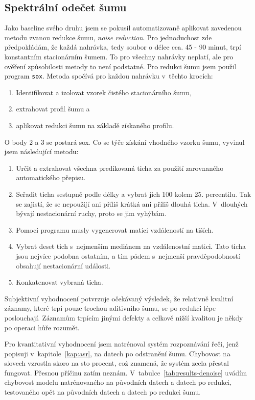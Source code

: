 \subsection{Spektrální odečet šumu}

Jako baseline svého druhu jsem se pokusil automatizovaně aplikovat zavedenou
metodu zvanou redukce šumu, \textit{noise reduction}. Pro jednoduchost zde
předpokládám, že každá nahrávka, tedy soubor o délce cca. 45 - 90 minut, trpí konstantním stacionárním šumem. To pro
všechny nahrávky neplatí, ale pro ověření způsobilosti metody to není podstatné.
Pro redukci šumu jsem použil program \texttt{sox}. Metoda spočívá pro každou
nahrávku v~těchto krocích:
\begin{enumerate}
\item{Identifikovat a izolovat vzorek čistého stacionárního šumu,}
\item{extrahovat profil šumu a}
\item{aplikovat redukci šumu na základě získaného profilu.}
\end{enumerate}

O body 2 a 3 se postará sox. Co se týče získání vhodného vzorku šumu, vyvinul jsem
následující metodu:
\begin{enumerate}
\item{
    Určit a extrahovat všechna predikovaná ticha za použití zarovnaného
    automatického přepisu.
}
\item{
    Seřadit ticha sestupně podle délky a vybrat jich 100 kolem 25. percentilu.
    Tak se zajistí, že se nepoužijí ani příliš krátká ani příliš dlouhá ticha.
    V~dlouhých bývají nestacionární ruchy, proto se jim vyhýbám.
}
\item{
    Pomocí programu musly vygenerovat matici vzdáleností na tiších.
}
\item{
    Vybrat deset tich s~nejmenším mediánem na vzdálenostní matici. Tato ticha
    jsou nejvíce podobna ostatním, a tím pádem s~nejmenší pravděpodobností
    obsahují nestacionární události.
}
\item{
    Konkatenovat vybraná ticha.
}
\end{enumerate}

Subjektivní vyhodnocení potvrzuje očekávaný výsledek, že relativně kvalitní
záznamy, které trpí pouze trochou aditivního šumu, se po redukci lépe
poslouchají. Záznamům trpícím jinými defekty a celkově nižší kvalitou je někdy po
operaci hůře rozumět.

Pro kvantitativní vyhodnocení jsem natrénoval systém rozpoznávání řeči, jenž
popisuji v~kapitole~\ref{kap:asr}, na datech po odstranění šumu. Chybovost na
slovech vzrostla skoro na sto procent, což znamená, že systém zcela přestal
fungovat. Přesnou příčinu zatím neznám.
V~tabulce~\ref{tab:results-denoise} uvádím chybovost modelu natrénovaného na
původních datech a datech po redukci, testovaného opět na původních datech a
datech po redukci šumu.

